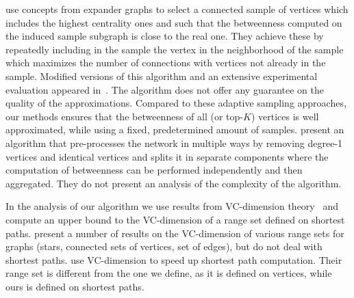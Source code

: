 \citet{MaiyaBW10} use concepts from expander
graphs to select a connected sample of vertices which includes the highest
centrality ones and such that the betweenness computed on the induced sample
subgraph is close to the real one.  They achieve these by repeatedly including
in the sample the vertex in the neighborhood of the sample which maximizes the
number of connections with vertices not already in the sample. Modified versions
of this algorithm and an extensive experimental evaluation appeared
in~\citep{LimMRTB11}. The algorithm does not offer any guarantee on the quality
of the approximations. Compared to these adaptive sampling approaches, our
methods ensures that the betweenness of all (or top-$K$) vertices is well
approximated, while using a fixed, predetermined amount of samples.
\citep{SaryuceSKC13} present an algorithm that pre-processes the network in
multiple ways by removing degree-1 vertices and identical vertices and splits it
in separate components where the computation of betweenness can be performed
independently and then aggregated. They do not present an analysis of the
complexity of the algorithm. 

In the analysis of our algorithm we use results from VC-dimension
theory~\citep{VapnikC71} and compute an upper bound to the VC-dimension of a
range set defined on shortest paths. \citet{KranakisKRUW97} present a number of
results on the VC-dimension of various range sets for graphs (stars, connected
sets of vertices, set of edges), but do not deal with shortest paths.
\citet{AbrahamDFGW11} use VC-dimension to speed up shortest path computation.
Their range set is different from the one we define, as it is defined on
vertices, while ours is defined on shortest paths.

